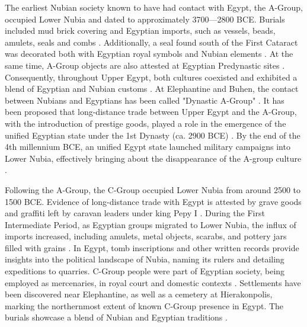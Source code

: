 The earliest Nubian society known to have had contact with Egypt, the A-Group, occupied Lower Nubia and dated to approximately 3700---2800 BCE. Burials included mud brick covering and Egyptian imports, such as vessels, beads, amulets, seals and combs \parencites{gattoNubianAGroupReassessment2006}[p.~35-36]{törökTwoWorldsFrontier2009}[p.~83]{williamsRelationsEgyptNubia2011}[p.~184-199]{royPoliticsTradeEgypt2011}[p.~294]{raueCulturalDiversityNubia2019}[p.~134, 136]{gattoAGroup4thMillennium2020}. Additionally, a seal found south of the First Cataract was decorated both with Egyptian royal symbols and Nubian elements \parencite[p.~134, 136]{gattoAGroup4thMillennium2020}. At the same time, A-Group objects are also attested at Egyptian Predynastic sites \parencites{gattoNubiansEgyptSurvey2005}[p.~63-64]{gattoNubianAGroupReassessment2006}{gattoEgyptNubia5th4th2009}[p.~95]{gattoCulturalEntanglementDawn2014}. Consequently, throughout Upper Egypt, both cultures coexisted and exhibited a blend of Egyptian and Nubian customs \parencites[p.~129]{gattoEgyptNubia5th4th2009}[p.~290-291]{meurerNubiansEgyptEarly2020}. At Elephantine and Buhen, the contact between Nubians and Egyptians has been called "Dynastic A-Group" \parencite[p.~4]{raueWhoWasWho2008}. It has been proposed that long-distance trade between Upper Egypt and the A-Group, with the introduction of prestige goods, played a role in the emergence of the unified Egyptian state under the 1st Dynasty (ca. 2900 BCE) \parencite[p.~49]{törökTwoWorldsFrontier2009}. By the end of the 4th millennium BCE, an unified Egypt state launched military campaigns into Lower Nubia, effectively bringing about the disappearance of the A-group culture \parencites{hafsaasEncounteringExpandingPredatory2026}.


Following the A-Group, the C-Group occupied Lower Nubia from around 2500 to 1500 BCE. Evidence of long-distance trade with Egypt is attested by grave goods and graffiti left by caravan leaders under king Pepy I \parencites[p.~166]{hafsaasCGroupPeopleLower2020}. During the First Intermediate Period, as Egyptian groups migrated to Lower Nubia, the influx of imports increased, including amulets, metal objects, scarabs, and pottery jars filled with grains \parencites[p.~303]{raueCulturalDiversityNubia2019}[p.~171]{hafsaasCGroupPeopleLower2020}. In Egypt, tomb inscriptions and other written records provide insights into the political landscape of Nubia, naming its rulers and detailing expeditions to quarries. C-Group people were part of Egyptian society, being employed as mercenaries, in royal court and domestic contexts \parencites[p.~96-99]{seidlmayerNubierImÄgytischen2002}[p.~569]{raueNubiansEgypt3rd2019}. Settlements have been discovered near Elephantine, as well as a cemetery at Hierakonpolis, marking the northernmost extent of known C-Group presence in Egypt. The burials showcase a blend of Nubian and Egyptian traditions \parencites{friedmanNubianCemeteryHierakonpolis2007}[p.~292]{meurerNubiansEgyptEarly2020}.


